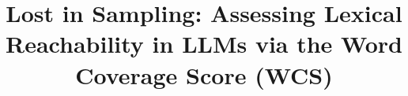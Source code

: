 \documentclass{article}
\begin{document}
\title{Lost in Sampling: Assessing Lexical Reachability in LLMs via the Word Coverage Score (WCS)}






\end{document}
